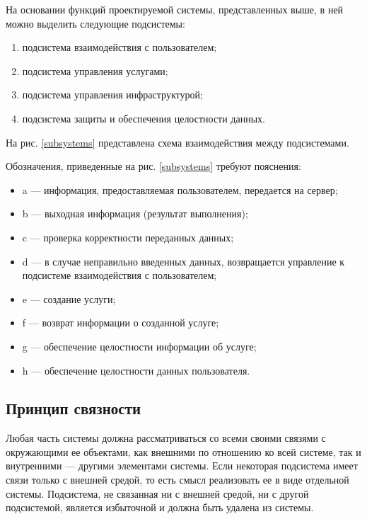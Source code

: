 На основании функций проектируемой системы, представленных выше, в ней можно выделить следующие подсистемы:
\begin{enumerate}
  \item подсистема взаимодействия с пользователем;
  \item подсистема управления услугами;
  \item подсистема управления инфраструктурой;
  \item подсистема защиты и обеспечения целостности данных.
\end{enumerate}

На рис. \ref{subsystems} представлена схема взаимодействия между подсистемами.

Обозначения, приведенные на рис. \ref{subsystems} требуют пояснения:
\begin{itemize}[label={}]
  \item a --- информация, предоставляемая пользователем, передается на сервер;
  \item b --- выходная информация (результат выполнения);
  \item c --- проверка корректности переданных данных;
  \item d --- в случае неправильно введенных данных, возвращается управление к подсистеме взаимодействия с пользователем;
  \item e --- создание услуги;
  \item f --- возврат информации о созданной услуге;
  \item g --- обеспечение целостности информации об услуге;
  \item h --- обеспечение целостности данных пользователя.
\end{itemize}

\subsection{Принцип связности}

Любая часть системы должна рассматриваться со всеми своими связями с окружающими ее объектами, как внешними по отношению ко всей системе, так и внутренними --- другими элементами системы.
Если некоторая подсистема имеет связи только с внешней средой, то есть смысл реализовать ее в виде отдельной системы.
Подсистема, не связанная ни с внешней средой, ни с другой подсистемой, является избыточной и должна быть удалена из системы.

